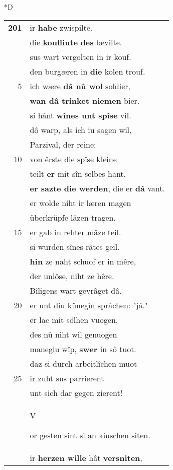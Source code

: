\documentclass[8pt,a4paper,notitlepage]{article}
\begin{document}
\begin{table}[ht]
\begin{minipage}[t]{0.5\linewidth}
\small
\begin{center}*D
\end{center}
\begin{tabular}{rl}
\textbf{201} & ir \textbf{habe} zwispilte.\\ 
 & die \textbf{koufliute} \textbf{des} bevilte.\\ 
 & sus wart vergolten in ir kouf.\\ 
 & den burgæren in \textbf{die} kolen trouf.\\ 
5 & ich wære \textbf{dâ nû wol} soldier,\\ 
 & \textbf{wan dâ trinket niemen} bier.\\ 
 & si hânt \textbf{wînes unt spîse} vil.\\ 
 & dô warp, als ich iu sagen wil,\\ 
 & Parzival, der reine:\\ 
10 & von êrste die spîse kleine\\ 
 & teilt \textbf{er} mit sîn selbes hant.\\ 
 & \textbf{er sazte die werden}, die er \textbf{dâ} vant.\\ 
 & er wolde niht ir læren magen\\ 
 & überkrüpfe lâzen tragen.\\ 
15 & er gab in rehter mâze teil.\\ 
 & si wurden sînes râtes geil.\\ 
 & \textbf{hin} ze naht schuof er in mêre,\\ 
 & der unlôse, niht ze hêre.\\ 
 & Bîligens wart gevrâget dâ.\\ 
20 & er unt diu künegîn sprâchen: "jâ."\\ 
 & er lac mit sölhen vuogen,\\ 
 & des nû niht wil genuogen\\ 
 & manegiu wîp, \textbf{swer} in sô tuot.\\ 
 & daz si durch arbeitlîchen muot\\ 
25 & ir zuht sus parrierent\\ 
 & unt sich dar gegen zierent!\\ 
 & \begin{large}V\end{large}or gesten sint si an kiuschen siten.\\ 
 & ir \textbf{herzen wille} hât \textbf{versniten},\\ 

\end{tabular}
\end{minipage}
\end{table}
\end{document}
